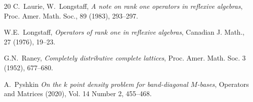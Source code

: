 \documentclass[12pt,oneside,a4paper]{amsart}
\begin{document}
\begin {thebibliography}{20}
    C.~\!Laurie, W.~\!Longstaff,
    \emph{A note on rank one operators in reflexive algebras},
    Proc. Amer. Math. Soc., 89 (1983), 293--297.

    W.E.~\!Longstaff,
    \emph{Operators of rank one in reflexive algebras},
    Canadian J. Math., 27 (1976), 19--23.

    G.N.~\!Raney,
    \emph{Completely distributive complete lattices},
    Proc. Amer. Math. Soc. 3 (1952), 677--680.

    A.~\!Pyshkin
    \emph{On the $k$ point density problem for band-diagonal $M$-bases},
    Operators and Matrices (2020), Vol. 14 Number 2, 455--468.


\end{thebibliography}
\end{document}
